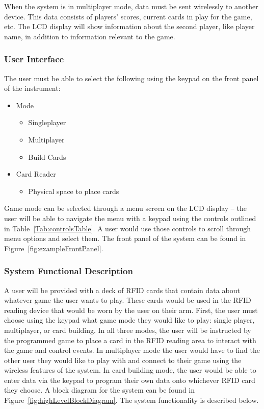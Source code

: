 \documentclass[12pt]{article} %
\begin{document}
When the system is in multiplayer mode, data must be sent wirelessly to another device. This data consists of players’ scores, current cards in play for the game, etc.  The LCD display will show information about the second player, like player name, in addition to information relevant to the game. 

\subsubsection{User Interface}\label{UI}

The user must be able to select the following using the keypad on the front panel of the instrument:

\begin{itemize}
	\item Mode
		\begin{itemize}
			\item Singleplayer
			\item Multiplayer
			\item Build Cards
		\end{itemize}
	\item Card Reader
		\begin{itemize}
			\item Physical space to place cards
		\end{itemize}
\end{itemize}

Game mode can be selected through a menu screen on the LCD display – the user will be able to navigate the menu with a keypad using the controls outlined in Table~\ref{Tab:controlsTable}.  A user would use those controls to scroll through menu options and select them. The front panel of the system can be found in Figure~\ref{fig:exampleFrontPanel}.

\subsubsection{System Functional Description}\label{sysFunctDesc}

A user will be provided with a deck of RFID cards that contain data about whatever game the user wants to play.  These cards would be used in the RFID reading device that would be worn by the user on their arm.  First, the user must choose using the keypad what game mode they would like to play: single player, multiplayer, or card building.  In all three modes, the user will be instructed by the programmed game to place a card in the RFID reading area to interact with the game and control events. In multiplayer mode the user would have to find the other user they would like to play with and connect to their game using the wireless features of the system.  In card building mode, the user would be able to enter data via the keypad to program their own data onto whichever RFID card they choose.  A block diagram for the system can be found in Figure~\ref{fig:highLevelBlockDiagram}.  The system functionality is described below.
\end{document}
